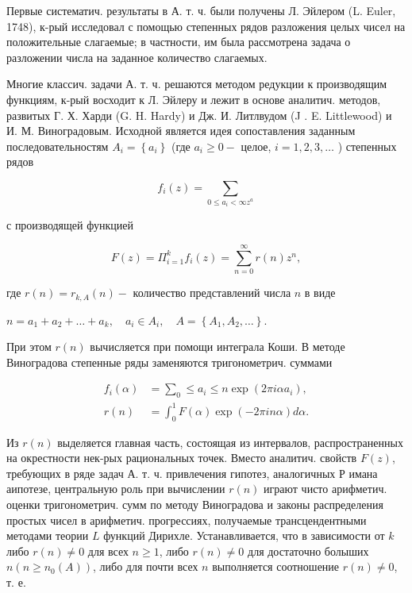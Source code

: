 \documentclass[10pt]{article}
\begin{document}
Первые систематич. результаты в А. т. ч. были получены Л. Эйлером (L. Euler, 1748), к-рый исследовал с помощью степенных рядов разложения целых чисел на положительные слагаемые; в частности, им была рассмотрена задача о разложении числа на заданное количество слагаемых.



Многие классич. задачи А. т. ч. решаются методом редукции к производящим функциям, к-рый восходит к Л. Эйлеру и лежит в основе аналитич. методов, развитых Г. Х. Харди (G. H. Hardy) и Дж. И. Литлвудом (J . E. Littlewood) и И. М. Виноградовым. Исходной является идея сопоставления заданным последовательностям $A_{i}=\left\{a_{i}\right\}$ (где $a_{i} \geqslant 0-$ целое, $i=1,2,3, \ldots$ ) степенных рядов



\[

f_{i}(z)=\sum_{0 \leqslant a_{i}<\infty z^{a}}

\]



с производящей функцией



\[

F(z)=\Pi_{i=1}^{k} f_{i}(z)=\sum_{n=0}^{\infty} r(n) z^{n},

\]



где $r(n)=r_{k, A}(n)-$ количество представлений числа $n$ в виде



$n=a_{1}+a_{2}+\ldots+a_{k}, \quad a_{i} \in A_{i}, \quad A=\left\{A_{1}, A_{2}, \ldots\right\}$.



При этом $r(n)$ вычисляется при помощи интеграла Коши. В методе Виноградова степенные ряды заменяются тригонометрич. суммами



\[

\begin{aligned}

f_{i}(\alpha) & =\sum_{0} \leqslant a_{i} \leqslant n \exp \left(2 \pi i \alpha a_{i}\right), \\

r(n) & =\int_{0}^{1} F(\alpha) \exp (-2 \pi i n \alpha) d \alpha .

\end{aligned}

\]



Из $r(n)$ выделяется главная часть, состоящая из интервалов, распространенных на окрестности нек-рых рациональных точек. Вместо аналитич. свойств $F(z)$, требующих в ряде задач А. т. ч. привлечения гипотез, аналогичных Р имана аипотезе, центральную роль при вычислении $r(n)$ играют чисто арифметич. оценки тригонометрич. сумм по методу Виноградова и законы распределения простых чисел в арифметич. прогрессиях, получаемые трансцендентными методами теории $L$ функций Дирихле. Устанавливается, что в зависимости от $k$ либо $r(n) \neq 0$ для всех $n \geqslant 1$, либо $r(n) \neq 0$ для достаточно болыших $n\left(n \geqslant n_{0}(A)\right)$, либо для почти всех $n$ выполняется соотношение $r(n) \neq 0$, т. е.
\end{document}
